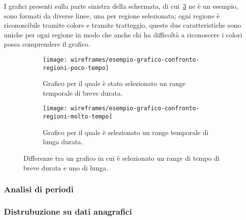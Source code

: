 I grafici presenti sulla parte sinistra della schermata, di cui~\ref{fig:esempio-grafico-confronto-regioni} ne è un esempio, sono formati da diverse linee, una per regione selezionata; ogni regione è riconoscibile tramite colore e tramite tratteggio, queste due caratteristiche sono uniche per ogni regione in modo che anche chi ha difficoltà a riconoscere i colori possa comprendere il grafico.

\begin{figure}[H]
    \begin{subfigure}[b]{0.5\textwidth}
        \centering
        \texttt{[image: wireframes/esempio-grafico-confronto-regioni-poco-tempo]}
        \caption{Grafico per il quale è stato selezionato un range temporale di breve durata.}
        \label{fig:esempio-grafico-confronto-regioni-poco-tempo}
    \end{subfigure}
\hfill
    \begin{subfigure}[b]{0.5\textwidth}
        \centering
        \texttt{[image: wireframes/esempio-grafico-confronto-regioni-molto-tempo]}
        \caption{Grafico per il quale è selezionato un range temporale di lunga durata.}
        \label{fig:esempio-grafico-confronto-regioni-molto-tempo}
    \end{subfigure}
    \caption{Differenze tra un grafico in cui è selezionato un range di tempo di breve durata e uno di lunga.}
    \label{fig:esempio-grafico-confronto-regioni}
\end{figure}

\subsubsection{Analisi di periodi}\label{ss:analisi-di-periodi}

\subsubsection{Distrubuzione su dati anagrafici}\label{ss:distribuzione-su-dati-anagrafici}
